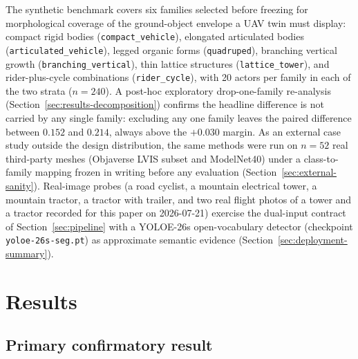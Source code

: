 \documentclass[11pt,a4paper]{article}
\begin{document}
The synthetic benchmark covers six families selected before freezing for
morphological coverage of the ground-object envelope a UAV twin must display:
compact rigid bodies (\texttt{compact\_vehicle}), elongated articulated bodies
(\texttt{articulated\_vehicle}), legged organic forms (\texttt{quadruped}),
branching vertical growth (\texttt{branching\_vertical}), thin lattice
structures (\texttt{lattice\_tower}), and rider-plus-cycle combinations
(\texttt{rider\_cycle}), with 20 actors per family in each of the two strata
(\(n{=}240\)). A post-hoc exploratory drop-one-family re-analysis
(Section~\ref{sec:results-decomposition}) confirms the headline difference is
not carried by any single family: excluding any one family leaves the paired
difference between \(0.152\) and \(0.214\), always above the \(+0.030\)
margin. As an external case study outside the design distribution, the same
methods were run on \(n{=}52\) real third-party meshes (Objaverse LVIS subset
and ModelNet40) under a class-to-family mapping frozen in writing before any
evaluation (Section~\ref{sec:external-sanity}). Real-image probes (a road
cyclist, a mountain electrical tower, a mountain tractor, a tractor with
trailer, and two real flight photos of a tower and a tractor recorded for
this paper on 2026-07-21) exercise the dual-input contract of
Section~\ref{sec:pipeline} with a
YOLOE-26s open-vocabulary detector (checkpoint \texttt{yoloe-26s-seg.pt}) as
approximate semantic evidence (Section~\ref{sec:deployment-summary}).

\section{Results}
\label{sec:primary-results}

\subsection{Primary confirmatory result}
\end{document}
